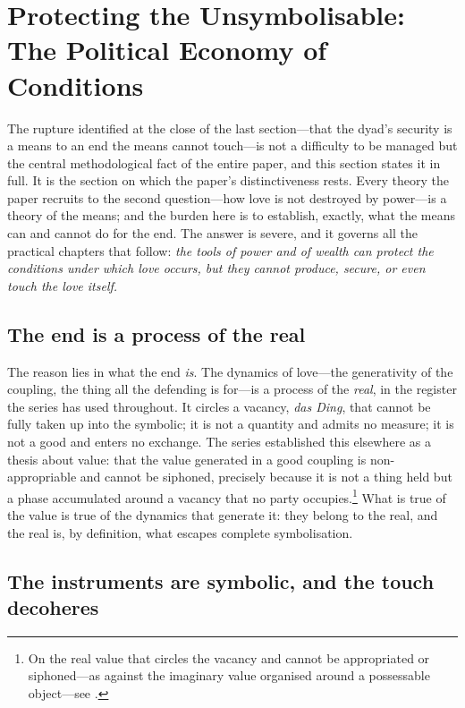 \section{Protecting the Unsymbolisable: The Political Economy of Conditions}
\label{p17:sec:conditions}

\noindent
The rupture identified at the close of the last section---that the dyad's security is a means to an end the means cannot touch---is not a difficulty to be managed but the central methodological fact of the entire paper, and this section states it in full. It is the section on which the paper's distinctiveness rests. Every theory the paper recruits to the second question---how love is not destroyed by power---is a theory of the means; and the burden here is to establish, exactly, what the means can and cannot do for the end. The answer is severe, and it governs all the practical chapters that follow: \emph{the tools of power and of wealth can protect the conditions under which love occurs, but they cannot produce, secure, or even touch the love itself.}

\subsection{The end is a process of the real}
\label{p17:sub:conditions-real}

The reason lies in what the end \emph{is}. The dynamics of love---the generativity of the coupling, the thing all the defending is for---is a process of the \emph{real}, in the register the series has used throughout. It circles a vacancy, \emph{das Ding}, that cannot be fully taken up into the symbolic; it is not a quantity and admits no measure; it is not a good and enters no exchange. The series established this elsewhere as a thesis about value: that the value generated in a good coupling is non-appropriable and cannot be siphoned, precisely because it is not a thing held but a phase accumulated around a vacancy that no party occupies.\footnote{On the real value that circles the vacancy and cannot be appropriated or siphoned---as against the imaginary value organised around a possessable object---see \textcite{paperix}.} What is true of the value is true of the dynamics that generate it: they belong to the real, and the real is, by definition, what escapes complete symbolisation.

\subsection{The instruments are symbolic, and the touch decoheres}
\label{p17:sub:conditions-symbolic}

